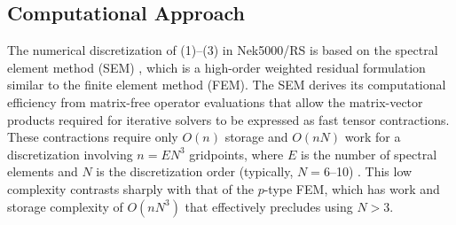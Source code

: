 \vspace{-.25in}
\subsection{Computational Approach }
\vspace{-.2in}

The numerical discretization of (1)--(3) in Nek5000/RS is based on the spectral
element method (SEM) \cite{pat84}, which is a high-order weighted residual
formulation similar to the finite element method (FEM).  The SEM derives its
computational efficiency from matrix-free operator evaluations that allow the
matrix-vector products required for iterative solvers to be expressed as fast
tensor contractions.  These contractions require only $O(n)$ storage and
$O(nN)$ work for a discretization involving $n=EN^3$ gridpoints, where $E$ is
the number of spectral elements and $N$ is the discretization order (typically,
$N=$6--10) \cite{dfm02}.  This low complexity contrasts sharply with that of
the $p$-type FEM, which has work and storage complexity of $O(nN^3)$ that
effectively precludes using $N>3$.

